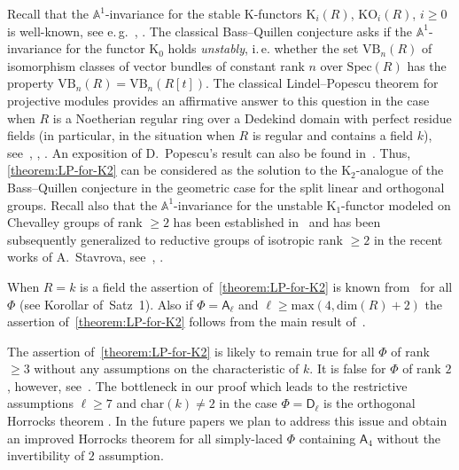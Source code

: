 \documentclass[oneside, 11pt]{amsart} \pdfoutput=1
\newcommand{\K}{{\mathrm{K}}}
\numberwithin{equation}{section}
\theoremstyle{definition}
\newcommand{\rA}{\mathsf{A}}
\newcommand{\rD}{\mathsf{D}}
\begin{document}
Recall that the $\mathbb{A}^1$-invariance for the stable $\K$-functors $\K_i(R)$, $\mathrm{KO}_i(R)$, $i \geq 0$ is well-known, see e.\,g.~\cite[Theorem~V.6.3]{Kbook}, \cite[Corollary~1.12]{Ho05}. The classical Bass--Quillen conjecture asks if the $\mathbb{A}^1$-invariance for the functor $\K_0$ holds {\it unstably}, i.\,e. whether the set $\mathrm{VB}_n(R)$ of isomorphism classes of vector bundles of constant rank $n$ over $\mathrm{Spec}(R)$ has the property $\mathrm{VB}_n(R) = \mathrm{VB}_n(R[t])$. 
The classical Lindel--Popescu theorem for projective modules provides an affirmative answer to this question in the case when $R$ is a Noetherian regular ring over a Dedekind domain with perfect residue fields (in particular, in the situation when $R$ is regular and contains a field $k$), see~\cite{Li81}, \cite{Po85}, \cite[Theorem~5.2.1]{AHW17}. An exposition of D.~Popescu's result can also be found in~\cite{Sw98}.
Thus, \cref{theorem:LP-for-K2} can be considered as the solution to the $\K_2$-analogue of the Bass--Quillen conjecture in the geometric case for the split linear and orthogonal groups.
Recall also that the $\mathbb{A}^1$-invariance for the unstable $\K_1$-functor modeled on Chevalley groups of rank $\geq 2$ has been established in~\cite{Abe83} and has been subsequently generalized to reductive groups of isotropic rank $\geq 2$ in the recent works of A.~Stavrova, see~\cite[Theorem~1.3]{Sta14}, \cite[Theorem~1.1]{Sta20}.

When $R=k$ is a field the assertion of~\cref{theorem:LP-for-K2} is known from~\cite{Re75} for all $\Phi$ (see Korollar of~Satz~1). Also if $\Phi = \rA_\ell$ and $\ell \geq \mathrm{max}(4, \mathrm{dim}(R) + 2)$ the assertion of~\cref{theorem:LP-for-K2} follows from the main result of~\cite{Tu83}.

The assertion of~\cref{theorem:LP-for-K2} is likely to remain true for all $\Phi$ of rank $\geq 3$ without any assumptions on the characteristic of $k$. It is false for $\Phi$ of rank $2$, however, see~\cite{We12}. The bottleneck in our proof which leads to the restrictive assumptions $\ell\geq 7$ and $\mathrm{char}(k)\neq 2$ in the case $\Phi=\rD_\ell$ is the orthogonal Horrocks theorem \cite[Theorem~1]{LS20}. In the future papers we plan to address this issue and obtain an improved Horrocks theorem for all simply-laced $\Phi$ containing $\rA_4$ without the invertibility of $2$ assumption.
\end{document}

